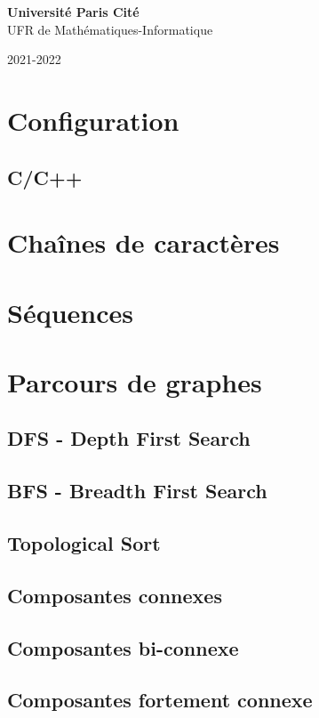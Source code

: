 \documentclass[8pt]{article}
\begin{document}
\begin{titlepage}
\begin{center}
        \textbf{Université Paris Cité}\\
        UFR de Mathématiques-Informatique

        2021-2022

    \end{center}
\end{titlepage}
    \section{Configuration}
        \subsection{C/C++}
    \section{Chaînes de caractères}
    \section{Séquences}
    \section{Parcours de graphes}
        \subsection{DFS - Depth First Search}
        {\scriptsize}
        \subsection{BFS - Breadth First Search}
        {\scriptsize}
        \subsection{Topological Sort}
        \subsection{Composantes connexes}
        \subsection{Composantes bi-connexe}
        \subsection{Composantes fortement connexe}
\end{document}
